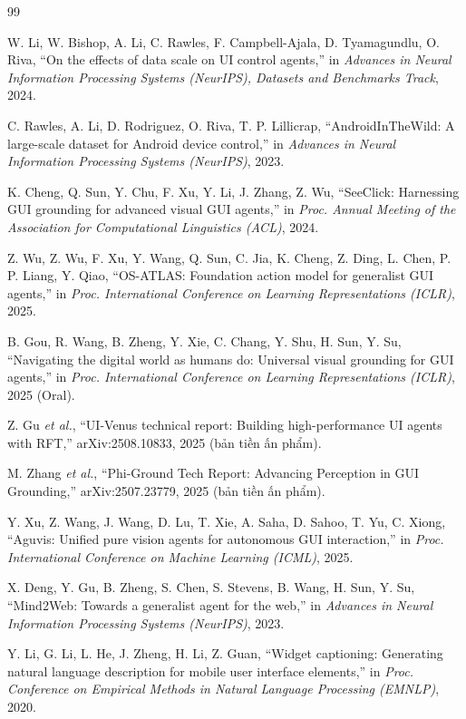 \clearpage
{}
\begin{thebibliography}{99}
\small

 W. Li, W. Bishop, A. Li, C. Rawles, F. Campbell-Ajala,
D. Tyamagundlu, O. Riva, ``On the effects of data scale on UI control agents,'' in
\emph{Advances in Neural Information Processing Systems (NeurIPS), Datasets and
Benchmarks Track}, 2024.

 C. Rawles, A. Li, D. Rodriguez, O. Riva, T. P. Lillicrap,
``AndroidInTheWild: A large-scale dataset for Android device control,'' in
\emph{Advances in Neural Information Processing Systems (NeurIPS)}, 2023.

 K. Cheng, Q. Sun, Y. Chu, F. Xu, Y. Li, J. Zhang, Z. Wu,
``SeeClick: Harnessing GUI grounding for advanced visual GUI agents,'' in
\emph{Proc. Annual Meeting of the Association for Computational Linguistics (ACL)},
2024.

 Z. Wu, Z. Wu, F. Xu, Y. Wang, Q. Sun, C. Jia, K. Cheng, Z. Ding,
L. Chen, P. P. Liang, Y. Qiao, ``OS-ATLAS: Foundation action model for generalist GUI
agents,'' in \emph{Proc. International Conference on Learning Representations (ICLR)},
2025.

 B. Gou, R. Wang, B. Zheng, Y. Xie, C. Chang, Y. Shu, H. Sun, Y. Su,
``Navigating the digital world as humans do: Universal visual grounding for GUI
agents,'' in \emph{Proc. International Conference on Learning Representations (ICLR)},
2025 (Oral).

 Z. Gu \emph{et al.}, ``UI-Venus technical report: Building high-performance
UI agents with RFT,'' arXiv:2508.10833, 2025 (bản tiền ấn phẩm).

 M. Zhang \emph{et al.}, ``Phi-Ground Tech Report: Advancing Perception
in GUI Grounding,'' arXiv:2507.23779, 2025 (bản tiền ấn phẩm).

 Y. Xu, Z. Wang, J. Wang, D. Lu, T. Xie, A. Saha, D. Sahoo, T. Yu,
C. Xiong, ``Aguvis: Unified pure vision agents for autonomous GUI interaction,'' in
\emph{Proc. International Conference on Machine Learning (ICML)}, 2025.

 X. Deng, Y. Gu, B. Zheng, S. Chen, S. Stevens, B. Wang, H. Sun, Y. Su,
``Mind2Web: Towards a generalist agent for the web,'' in \emph{Advances in Neural
Information Processing Systems (NeurIPS)}, 2023.

 Y. Li, G. Li, L. He, J. Zheng, H. Li, Z. Guan, ``Widget captioning:
Generating natural language description for mobile user interface elements,'' in
\emph{Proc. Conference on Empirical Methods in Natural Language Processing (EMNLP)},
2020.


\end{thebibliography}
